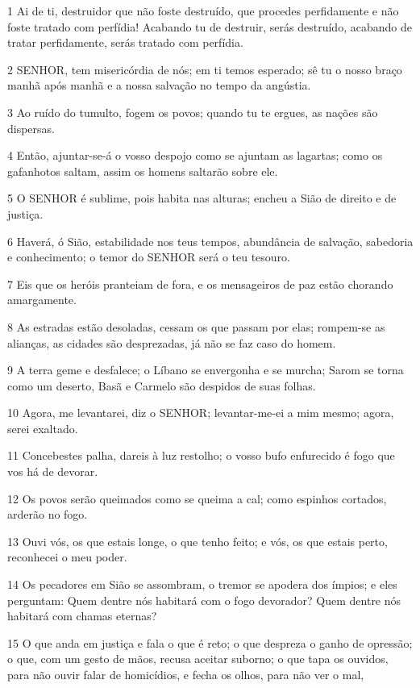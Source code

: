 \par 1 Ai de ti, destruidor que não foste destruído, que procedes perfidamente e não foste tratado com perfídia! Acabando tu de destruir, serás destruído, acabando de tratar perfidamente, serás tratado com perfídia.
\par 2 SENHOR, tem misericórdia de nós; em ti temos esperado; sê tu o nosso braço manhã após manhã e a nossa salvação no tempo da angústia.
\par 3 Ao ruído do tumulto, fogem os povos; quando tu te ergues, as nações são dispersas.
\par 4 Então, ajuntar-se-á o vosso despojo como se ajuntam as lagartas; como os gafanhotos saltam, assim os homens saltarão sobre ele.
\par 5 O SENHOR é sublime, pois habita nas alturas; encheu a Sião de direito e de justiça.
\par 6 Haverá, ó Sião, estabilidade nos teus tempos, abundância de salvação, sabedoria e conhecimento; o temor do SENHOR será o teu tesouro.
\par 7 Eis que os heróis pranteiam de fora, e os mensageiros de paz estão chorando amargamente.
\par 8 As estradas estão desoladas, cessam os que passam por elas; rompem-se as alianças, as cidades são desprezadas, já não se faz caso do homem.
\par 9 A terra geme e desfalece; o Líbano se envergonha e se murcha; Sarom se torna como um deserto, Basã e Carmelo são despidos de suas folhas.
\par 10 Agora, me levantarei, diz o SENHOR; levantar-me-ei a mim mesmo; agora, serei exaltado.
\par 11 Concebestes palha, dareis à luz restolho; o vosso bufo enfurecido é fogo que vos há de devorar.
\par 12 Os povos serão queimados como se queima a cal; como espinhos cortados, arderão no fogo.
\par 13 Ouvi vós, os que estais longe, o que tenho feito; e vós, os que estais perto, reconhecei o meu poder.
\par 14 Os pecadores em Sião se assombram, o tremor se apodera dos ímpios; e eles perguntam: Quem dentre nós habitará com o fogo devorador? Quem dentre nós habitará com chamas eternas?
\par 15 O que anda em justiça e fala o que é reto; o que despreza o ganho de opressão; o que, com um gesto de mãos, recusa aceitar suborno; o que tapa os ouvidos, para não ouvir falar de homicídios, e fecha os olhos, para não ver o mal,
